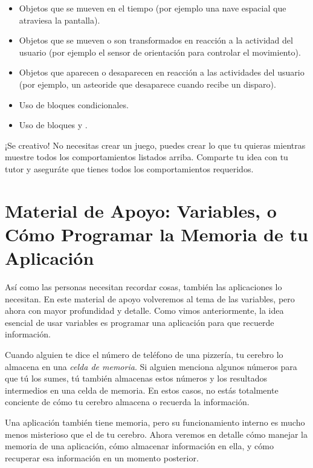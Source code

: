 \begin{itemize}

\item Objetos que se mueven en el tiempo (por ejemplo una nave
  espacial que atraviesa la pantalla).

\item Objetos que se mueven o son transformados en reacción a la
  actividad del usuario (por ejemplo el sensor de orientación para
  controlar el movimiento).

\item Objetos que aparecen o desaparecen en reacción a las actividades
  del usuario (por ejemplo, un asteoride que desaparece cuando recibe
  un disparo).

\item Uso de bloques condicionales.

\item Uso de bloques  y .

\end{itemize}

¡Se creativo! No necesitas crear un juego, puedes crear lo que tu
quieras mientras muestre todos los comportamientos listados arriba.
Comparte tu idea con tu tutor y aseguráte que tienes todos los
comportamientos requeridos.

\section{Material de Apoyo: Variables, o Cómo Programar la Memoria de
tu Aplicación}

Así como las personas necesitan recordar cosas, también las
aplicaciones lo necesitan. En este material de apoyo volveremos al
tema de las variables, pero ahora con mayor profundidad y
detalle. Como vimos anteriormente, la idea esencial de usar variables
es programar una aplicación para que recuerde información.

Cuando alguien te dice el número de teléfono de una pizzería, tu
cerebro lo almacena en una \emph{celda de memoria}. Si alguien
menciona algunos números para que tú los sumes, tú también almacenas
estos números y los resultados intermedios en una celda de memoria. En
estos casos, no estás totalmente conciente de cómo tu cerebro almacena
o recuerda la información.

Una aplicación también tiene memoria, pero su funcionamiento interno
es mucho menos misterioso que el de tu cerebro. Ahora veremos en
detalle cómo manejar la memoria de una aplicación, cómo almacenar
información en ella, y cómo recuperar esa información en un momento
posterior.

